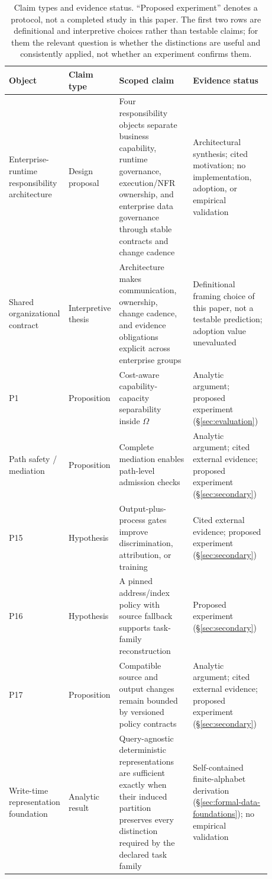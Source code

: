 \documentclass[11pt]{article}
\begin{document}
\begin{table}[H]
\centering
\caption{Claim types and evidence status. ``Proposed experiment'' denotes a protocol, not a completed study in this paper. The first two rows are definitional and interpretive choices rather than testable claims; for them the relevant question is whether the distinctions are useful and consistently applied, not whether an experiment confirms them.}
\label{tab:propositions}
\small
\begin{tabular}{p{0.15\linewidth}p{0.12\linewidth}p{0.30\linewidth}p{0.31\linewidth}}
\hline
Object & Claim type & Scoped claim & Evidence status \\
\hline
Enterprise-runtime responsibility architecture & Design proposal & Four responsibility objects separate business capability, runtime governance, execution/NFR ownership, and enterprise data governance through stable contracts and change cadence & Architectural synthesis; cited motivation; no implementation, adoption, or empirical validation \\
Shared organizational contract & Interpretive thesis & Architecture makes communication, ownership, change cadence, and evidence obligations explicit across enterprise groups & Definitional framing choice of this paper, not a testable prediction; adoption value unevaluated \\
P1 & Proposition & Cost-aware capability-capacity separability inside $\Omega$ & Analytic argument; proposed experiment (\S\ref{sec:evaluation}) \\
Path safety / mediation & Proposition & Complete mediation enables path-level admission checks & Analytic argument; cited external evidence; proposed experiment (\S\ref{sec:secondary}) \\
P15 & Hypothesis & Output-plus-process gates improve discrimination, attribution, or training & Cited external evidence; proposed experiment (\S\ref{sec:secondary}) \\
P16 & Hypothesis & A pinned address/index policy with source fallback supports task-family reconstruction & Proposed experiment (\S\ref{sec:secondary}) \\
P17 & Proposition & Compatible source and output changes remain bounded by versioned policy contracts & Analytic argument; cited external evidence; proposed experiment (\S\ref{sec:secondary}) \\
Write-time representation foundation & Analytic result & Query-agnostic deterministic representations are sufficient exactly when their induced partition preserves every distinction required by the declared task family & Self-contained finite-alphabet derivation (\S\ref{sec:formal-data-foundations}); no empirical validation \\

\end{tabular}
\end{table}
\end{document}
